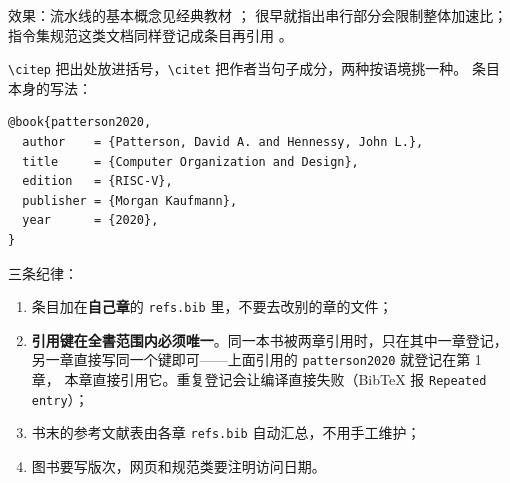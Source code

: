 效果：流水线的基本概念见经典教材 \citep{patterson2020}；
\citet{amdahl1967} 很早就指出串行部分会限制整体加速比；
指令集规范这类文档同样登记成条目再引用 \citep{riscvspec}。

\verb|\citep| 把出处放进括号，\verb|\citet| 把作者当句子成分，两种按语境挑一种。
条目本身的写法：

\begin{lstlisting}[language=TeX]
@book{patterson2020,
  author    = {Patterson, David A. and Hennessy, John L.},
  title     = {Computer Organization and Design},
  edition   = {RISC-V},
  publisher = {Morgan Kaufmann},
  year      = {2020},
}
\end{lstlisting}

三条纪律：

\begin{enumerate}
  \item 条目加在\textbf{自己章}的 \texttt{refs.bib} 里，不要去改别的章的文件；
  \item \textbf{引用键在全書范围内必须唯一}。同一本书被两章引用时，只在其中一章登记，
        另一章直接写同一个键即可——上面引用的 \texttt{patterson2020} 就登记在第 1 章，
        本章直接引用它。重复登记会让编译直接失败（BibTeX 报 \texttt{Repeated entry}）；
  \item 书末的参考文献表由各章 \texttt{refs.bib} 自动汇总，不用手工维护；
  \item 图书要写版次，网页和规范类要注明访问日期。
\end{enumerate}
